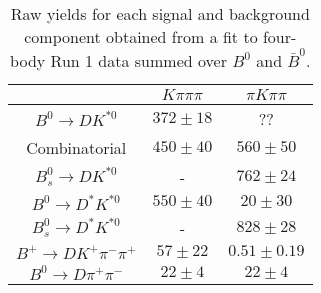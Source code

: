 \begin{table}
  \centering
  \begin{tabular}{ccc}
      \toprule
       & $K\pi\pi\pi$ & $\pi K\pi\pi$ \\
      \midrule
      $B^0 \to DK^{*0}$ & $372 \pm 18$ & ?? \\
      Combinatorial & $450 \pm 40$ & $560 \pm 50$ \\
      $B^0_s \to DK^{*0}$ & \-- & $762 \pm 24$ \\
      $B^0 \to D^*K^{*0}$ & $550 \pm 40$ & $20 \pm 30$ \\
      $B^0_s \to D^*K^{*0}$ & \-- & $828 \pm 28$ \\
      $B^+ \to DK^+\pi^-\pi^+$ & $57 \pm 22$ & $0.51 \pm 0.19$ \\
      $B^0 \to D\pi^+\pi^-$ & $22 \pm 4$ & $22 \pm 4$ \\
      \bottomrule
      \end{tabular}
  \caption{Raw yields for each signal and background component obtained from a fit to four-body Run 1 data summed over $B^0$ and $\bar{B}^0$.}
\label{tab:yields_combined_4body_run1}
\end{table}

